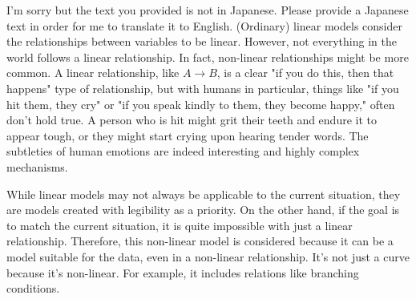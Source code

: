 \documentclass{ltjsbook}
\begin{document}
I'm sorry but the text you provided is not in Japanese. Please provide a Japanese text in order for me to translate it to English.
(Ordinary) linear models consider the relationships between variables to be linear. However, not everything in the world follows a linear relationship. In fact, non-linear relationships might be more common. A linear relationship, like $A \to B$, is a clear "if you do this, then that happens" type of relationship, but with humans in particular, things like "if you hit them, they cry" or "if you speak kindly to them, they become happy," often don't hold true. A person who is hit might grit their teeth and endure it to appear tough, or they might start crying upon hearing tender words. The subtleties of human emotions are indeed interesting and highly complex mechanisms.

While linear models may not always be applicable to the current situation, they are models created with legibility as a priority. On the other hand, if the goal is to match the current situation, it is quite impossible with just a linear relationship. Therefore, this non-linear model is considered because it can be a model suitable for the data, even in a non-linear relationship. It's not just a curve because it's non-linear. For example, it includes relations like branching conditions.
\end{document}
